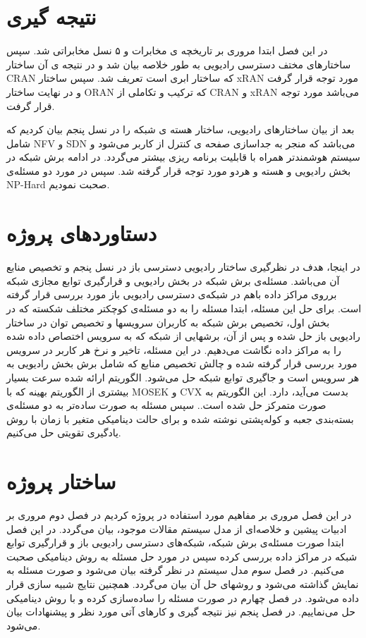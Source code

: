 \section{نتیجه گیری}
  در این فصل ابتدا مروری بر تاریخچه ی مخابرات و ۵ نسل مخابراتی شد. سپس ساختارهای مختف دسترسی رادیویی به طور خلاصه بیان شد و در نتیجه ی آن ساختار CRAN که ساختار ابری است تعریف شد. سپس ساختار xRAN
  مورد توجه قرار گرفت و در نهایت ساختار ORAN 
  که ترکیب و تکاملی از CRAN و xRAN می‌باشد مورد توجه قرار گرفت.
  
 بعد از بیان ساختارهای رادیویی، ساختار هسته ی شبکه را در نسل پنجم بیان کردیم که شامل 
 NFV و SDN 
 می‌باشد که منجر به جداسازی صفحه ی کنترل از کاربر می‌شود و سیستم هوشمندتر همراه با قابلیت برنامه ریزی بیشتر می‌گردد.
 در ادامه برش شبکه در بخش رادیویی و هسته و هردو مورد توجه قرار گرفته شد.
 سپس در مورد دو مسئله‌ی NP-Hard صحبت نمودیم.
\section{دستاوردهای پروژه}
در اینجا، هدف در نظرگیری ساختار رادیویی دسترسی باز در نسل پنجم و تخصیص منابع آن می‌باشد.
 مسئله‌ی برش شبکه در بخش رادیویی و قرارگیری توابع مجازی شبکه برروی مراکز داده باهم در شبکه‌ی دسترسی رادیویی باز مورد بررسی قرار گرفته است.
برای حل این مسئله، ابتدا مسئله را به دو مسئله‌ی کوچکتر مختلف شکسته که در بخش اول، تخصیص برش شبکه به کاربران سرویسها و تخصیص توان در ساختار رادیویی باز حل شده و پس از آن، برشهایی از شبکه که به سرویس اختصاص داده شده را به مراکز داده نگاشت می‌دهیم.
در این مسئله، تاخیر و نرخ هر کاربر در سرویس مورد بررسی قرار گرفته شده و چالش تخصیص منابع که شامل برش بخش رادیویی به هر سرویس است و جاگیری توابع شبکه حل می‌شود.
الگوریتم ارائه شده سرعت بسیار بیشتری از الگوریتم بهینه که با MOSEK و CVX بدست می‌آید، دارد. این الگوریتم به صورت متمرکز حل شده است.. 
سپس مسئله به صورت ساده‌تر به دو مسئله‌ی بسته‌بندی جعبه و کوله‌پشتی نوشته شده و برای حالت دینامیکی متغیر با زمان با روش یادگیری تقویتی حل می‌کنیم. 
\section{ساختار پروژه}
در این فصل مروری بر مفاهیم مورد استفاده در پروژه کردیم
در فصل دوم مروری بر ادبیات پیشین و خلاصه‌ای از مدل سیستم مقالات موجود، بیان می‌گردد. در این فصل ابتدا صورت مسئله‌ی برش شبکه، شبکه‌های دسترسی رادیویی باز و قرارگیری توابع شبکه در مراکز داده بررسی کرده سپس در مورد حل مسئله به روش دینامیکی صحبت می‌کنیم.
در فصل سوم مدل سیستم در نظر گرفته بیان می‌شود و صورت مسئله به نمایش گذاشته می‌شود و روشهای حل آن بیان می‌گردد. همچنین  نتایج شبیه سازی قرار داده می‌شود.
در فصل چهارم در صورت مسئله را ساده‌سازی کرده و با روش دینامیکی حل می‌نماییم.
در فصل پنجم نیز نتیجه گیری و کارهای آتی مورد نظر و پیشنهادات بیان می‌شود.   
 